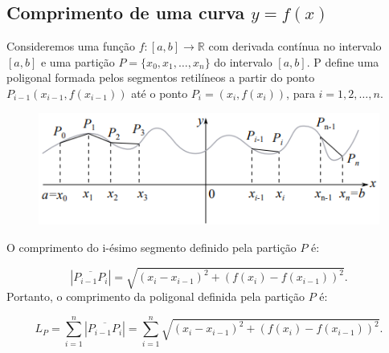 \cleardoublepage\documentclass[../main.tex]{subfiles}
\begin{document}
\subsection*{Comprimento de uma curva $y = f(x)$}
Consideremos uma função \(f:[a,b] \to \mathbb{R}\) com derivada contínua no intervalo \([a,b]\) e uma partição \(P=\{x_0,x_1,\ldots,x_n \}\) do intervalo \([a,b]\). P define uma poligonal formada pelos segmentos retilíneos a partir do ponto \(P_{i-1}(x_{i-1},f(x_{i-1}))\) até o ponto \(P_i=(x_{i},f(x_{i}))\), para \(i=1,2,\dots,n\).
\begin{figure}
    \centering
    \includegraphics{figs/CompArcos/IlustCompArcos.png}
    \caption{}
    \label{fig:IlustCompArcos}
\end{figure}
O comprimento do i-ésimo segmento definido pela partição \(P\) é:

\[ \left|\overline{P_{i-1}P_i} \right|=\sqrt{(x_i - x_{i-1})^2 + (f(x_i) - f(x_{i-1}))^2 }. \]
Portanto, o comprimento da poligonal definida pela partição \(P\) é:

\[ L_P = \sum\limits^{n}_{i=1}\left|\overline{P_{i-1}P_i} \right|=\sum\limits^{n}_{i=1}\sqrt{(x_i - x_{i-1})^2 + (f(x_i) - f(x_{i-1}))^2 }. \]
\end{document}
